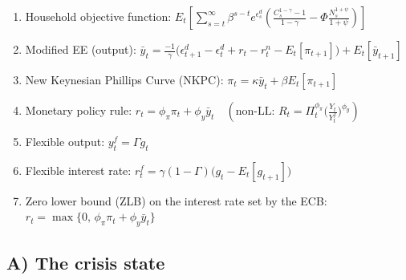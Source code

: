 \documentclass{article}
\begin{document}
\begin{RecapBox}
\begin{enumerate}  
    \item Household objective function:  
    $E_t\left[ \sum_{s=t}^{\infty} \beta^{s-t} e^{\epsilon_s^d} \left(\frac{C_s^{1-\gamma}-1}{1-\gamma} - \Phi \frac{N_s^{1+\psi}}{1+\psi}\right) \right]$  
      
    \item Modified EE (output):  
    $\bar{y}_t = \frac{-1}{\gamma}\Big(\epsilon_{t+1}^d - \epsilon_t^d + r_t - r_t^n - E_t[\pi_{t+1}]\Big) + E_t[\bar{y}_{t+1}]$  
      
    \item New Keynesian Phillips Curve (NKPC):  
    $\pi_t = \kappa\bar{y}_t + \beta E_t[\pi_{t+1}] $  
      
    \item Monetary policy rule:  
    $r_t = \phi_\pi \pi_t + \phi_y \bar{y}_t \quad (\text{non-LL: } R_t = \Pi_t^{\phi_\pi}\Big(\frac{Y_t}{Y_t^f}\Big)^{\phi_y})$  
      
    \item Flexible output:  
    $y_t^f = \Gamma g_t$  
      
    \item Flexible interest rate:  
    $r_t^f = \gamma (1-\Gamma)\Big( g_t - E_t[g_{t+1}]\Big)$  
      
    \item Zero lower bound (ZLB) on the interest rate set by the ECB:  
    $r_t = \max \Big\{ 0,\, \phi_\pi \pi_t + \phi_y \bar{y}_t \Big\}$  
\end{enumerate}  
\end{RecapBox}
\subsection{A) The crisis state}
\end{document}
